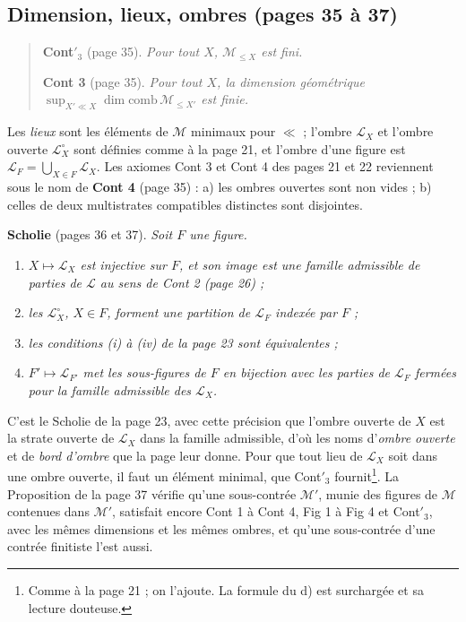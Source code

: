\documentclass[11pt,a4paper]{article}
\begin{document}
\subsection*{Dimension, lieux, ombres (pages 35 à 37)}

\begin{quote}
\textbf{Cont}$'_{3}$ (page 35). \emph{Pour tout $X$, $\mathcal{M}_{\leq X}$ est
fini.}

\textbf{Cont 3} (page 35). \emph{Pour tout $X$, la dimension géométrique
$\sup_{X' \ll X} \dim \mathrm{comb}\, \mathcal{M}_{\leq X'}$ est finie.}
\end{quote}

Les \emph{lieux} sont les éléments de $\mathcal{M}$ minimaux pour $\ll$ ;
l'ombre $\mathcal{L}_{X}$ et l'ombre ouverte $\mathcal{L}^{\circ}_{X}$ sont
définies comme à la page 21, et l'ombre d'une figure est $\mathcal{L}_{F} =
\bigcup_{X \in F} \mathcal{L}_{X}$. Les axiomes Cont 3 et Cont 4 des pages 21
et 22 reviennent sous le nom de \textbf{Cont 4} (page 35) : a) les ombres
ouvertes sont non vides ; b) celles de deux multistrates compatibles distinctes
sont disjointes.

\textbf{Scholie} (pages 36 et 37). \emph{Soit $F$ une figure.}
\begin{enumerate}
\item[a)] \emph{$X \mapsto \mathcal{L}_{X}$ est injective sur $F$, et son image
est une famille admissible de parties de $\mathcal{L}$ au sens de Cont 2 (page
26) ;}
\item[b)] \emph{les $\mathcal{L}^{\circ}_{X}$, $X \in F$, forment une partition
de $\mathcal{L}_{F}$ indexée par $F$ ;}
\item[c)] \emph{les conditions (i) à (iv) de la page 23 sont équivalentes ;}
\item[d)] \emph{$F' \mapsto \mathcal{L}_{F'}$ met les sous-figures de $F$ en
bijection avec les parties de $\mathcal{L}_{F}$ fermées pour la famille
admissible des $\mathcal{L}_{X}$.}
\end{enumerate}

C'est le Scholie de la page 23, avec cette précision que l'ombre ouverte de $X$
est la strate ouverte de $\mathcal{L}_{X}$ dans la famille admissible, d'où
les noms d'\emph{ombre ouverte} et de \emph{bord d'ombre} que la page leur
donne. Pour que tout lieu de $\mathcal{L}_{X}$ soit dans une ombre ouverte, il
faut un élément minimal, que Cont$'_{3}$ fournit\footnote{Comme à la page 21 ;
on l'ajoute. La formule du d) est surchargée et sa lecture douteuse.}. La
Proposition de la page 37 vérifie qu'une sous-contrée $\mathcal{M}'$, munie des
figures de $\mathcal{M}$ contenues dans $\mathcal{M}'$, satisfait encore Cont 1
à Cont 4, Fig 1 à Fig 4 et Cont$'_{3}$, avec les mêmes dimensions et les mêmes
ombres, et qu'une sous-contrée d'une contrée finitiste l'est aussi.
\end{document}
